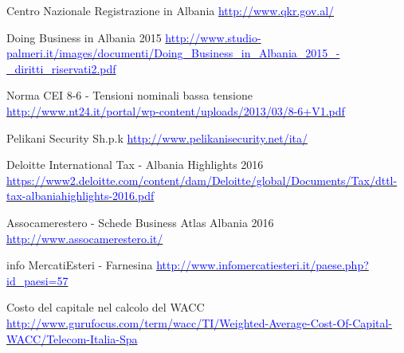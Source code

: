 \begin{thebibliography}{99}
	 Centro Nazionale Registrazione in Albania\newline 
			\href{http://www.qkr.gov.al/}{\textcolor{blue}{http://www.qkr.gov.al/}}

	 Doing Business in Albania 2015\newline 
			\href{http://www.studio-palmeri.it/images/documenti/Doing\_Business\_in\_Albania\_2015\_-\_diritti\_riservati2.pdf}{\textcolor{blue}{http://www.studio-palmeri.it/images/documenti/Doing\_Business\_in\_Albania\_2015\_-\_diritti\_riservati2.pdf}}

	 Norma CEI 8-6 - Tensioni nominali bassa tensione\newline 
			\href{http://www.nt24.it/portal/wp-content/uploads/2013/03/8-6+V1.pdf}{\textcolor{blue}{http://www.nt24.it/portal/wp-content/uploads/2013/03/8-6+V1.pdf}}
	
	 Pelikani Security Sh.p.k\newline 
			\href{http://www.pelikanisecurity.net/ita/}{\textcolor{blue}{http://www.pelikanisecurity.net/ita/}}

	 Deloitte International Tax - Albania Highlights 2016 \newline 
			\href{https://www2.deloitte.com/content/dam/Deloitte/global/Documents/Tax/dttl-tax-albaniahighlights-2016.pdf}{\textcolor{blue}{https://www2.deloitte.com/content/dam/Deloitte/global/Documents/Tax/dttl-tax-albaniahighlights-2016.pdf}}

	 Assocamerestero - Schede Business Atlas Albania 2016 \newline 
			\href{http://www.assocamerestero.it/}{\textcolor{blue}{http://www.assocamerestero.it/}}	

	 info MercatiEsteri - Farnesina \newline 
			\href{http://www.infomercatiesteri.it/paese.php?id\_paesi=57}{\textcolor{blue}{http://www.infomercatiesteri.it/paese.php?id\_paesi=57	}}
	
	 Costo del capitale nel calcolo del \ac{WACC} \newline 
			\href{http://www.gurufocus.com/term/wacc/TI/Weighted-Average-Cost-Of-Capital-WACC/Telecom-Italia-Spa}{\textcolor{blue}{http://www.gurufocus.com/term/wacc/TI/Weighted-Average-Cost-Of-Capital-WACC/Telecom-Italia-Spa}}
	
	
	
\end{thebibliography}